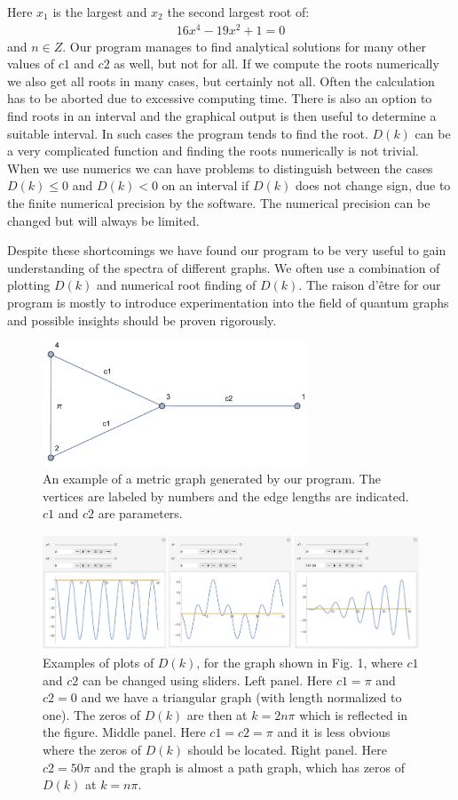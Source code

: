 \documentclass[a4paper]{article}
\begin{document}
Here $x_1$ is the largest and $x_2$ the second largest root of:
\begin{align}
16 x^4 - 19 x^2 + 1=0
\end{align}
and $n\in Z$. Our program manages to find analytical solutions for many other values of $c1$ and $c2$ as well, but not for all.
If we compute the roots numerically we also get all roots in many cases, but certainly not all. Often the calculation has to be aborted due to excessive computing time. There is also an option to find roots in an interval and the graphical output is then useful to determine a suitable interval. In such cases the program tends to find the root. $D(k)$ can be a very complicated function and finding the roots numerically is not trivial.
When we use numerics we can have problems to distinguish between the cases $D(k)\leq 0$ and $D(k) < 0$ on an interval if $D(k)$ does not change sign, due to the finite numerical precision by the software. The numerical precision can be changed but will always be limited.

Despite these shortcomings we have found our program to be very useful to gain understanding of the spectra of different graphs. We often use a combination of plotting $D(k)$ and numerical root finding of $D(k)$. The raison d'être for our program is mostly to introduce experimentation into the field of quantum graphs and possible insights should be proven rigorously.
\begin{figure}
\centering
\includegraphics[width=0.7\textwidth]{graph.pdf}
\caption{\label{fig:graph}An example of a metric graph generated by our program. The vertices are labeled by numbers and the edge lengths are indicated. $c1$ and $c2$ are  parameters.}
\end{figure}


\begin{figure}
\centering
\includegraphics[width=1.0\textwidth]{all.pdf}
\caption{\label{fig:all}Examples of plots of $D(k)$, for the graph shown in Fig. 1, where $c1$ and $c2$ can be changed using sliders. Left panel. Here $c1=\pi$ and $c2=0$ and we have a triangular graph (with length normalized to one). The zeros of $D(k)$ are then at $k=2n\pi$ which is reflected in the figure. Middle panel. Here $c1=c2=\pi$ and it is less obvious where the zeros of $D(k)$ should be located. Right panel. Here $c2=50\pi$ and the graph is almost a path graph, which has zeros of $D(k)$ at $k=n\pi$.}
\end{figure}
\end{document}
